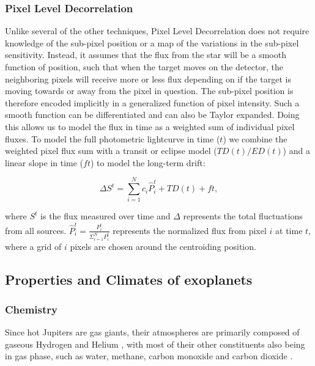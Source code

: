 \subsubsection{Pixel Level Decorrelation}

Unlike several of the other techniques, Pixel Level Decorrelation \citep{Deming2015} does not require knowledge of the sub-pixel position or a map of the variations in the sub-pixel sensitivity. Instead, it assumes that the flux from the star will be a smooth function of position, such that when the target moves on the detector, the neighboring pixels will receive more or less flux depending on if the target is moving towards or away from the pixel in question. The sub-pixel position is therefore encoded implicitly in a generalized function of pixel intensity. Such a smooth function can be differentiated and can also be Taylor expanded. Doing this allows us to model the flux in time as a weighted sum of individual pixel fluxes. To model the full photometric lightcurve in time ($t$) we combine the weighted pixel flux sum with a transit or eclipse model ($TD(t)/ED(t)$) and a linear slope in time ($ft$) to model the long-term drift:

\begin{equation}
    \Delta S^t = \sum_{i=1}^{N}c_i \hat{P}_i^t + TD(t) + ft,
\end{equation}

where $S^t$ is the flux measured over time and $\Delta$ represents the total fluctuations from all sources. $\hat{P}_i^t = \frac{P_i^t}{\Sigma_{i=1}^{N}P_i^t}$ represents the normalized flux from pixel $i$ at time $t$, where a grid of $i$ pixels are chosen around the centroiding position.

\subsection{Properties and Climates of exoplanets}%

\subsubsection{Chemistry}

Since hot Jupiters are gas giants, their atmospheres are primarily composed of gaseous Hydrogen and Helium \citep{Seager1999}, with most of their other constituents also being in gas phase, such as water, methane, carbon monoxide and carbon dioxide \citep{Brown2001}.

